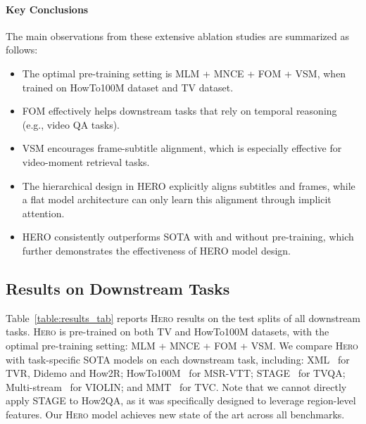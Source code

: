 \documentclass[11pt,a4paper]{article}
\begin{document}
\paragraph{Key Conclusions}

The main observations from these extensive ablation studies are summarized as follows:
\begin{itemize}
 \item The optimal pre-training setting is MLM + MNCE + FOM + VSM, when trained on HowTo100M dataset and TV dataset.
 \vspace{-2mm}
    \item FOM effectively helps downstream tasks that rely on temporal reasoning (e.g., video QA tasks). 
    \vspace{-2mm}
    \item VSM encourages frame-subtitle alignment, which is especially effective for video-moment retrieval tasks.
    \vspace{-2mm}
       \item The hierarchical design in \textsc{HERO} explicitly aligns subtitles and frames, while a flat model architecture can only learn this alignment through implicit attention.
       \vspace{-2mm}
    \item \textsc{HERO} consistently outperforms SOTA with and without pre-training, which further demonstrates the effectiveness of \textsc{HERO} model design.
\end{itemize}

\subsection{Results on Downstream Tasks}\label{sec:sota_comparison}
Table~\ref{table:results_tab} reports \textsc{Hero} results on the test splits of all downstream tasks. \textsc{Hero} is pre-trained on both TV and HowTo100M datasets, with the optimal pre-training setting: MLM + MNCE + FOM + VSM. We compare \textsc{Hero} with task-specific SOTA models on each downstream task, including: XML~\citep{lei2020tvr} for TVR, Didemo and How2R; HowTo100M~\citep{miech2019howto100m} for MSR-VTT; STAGE~\citep{lei2019tvqaplus} for TVQA; Multi-stream~\citep{liu2020violin} for VIOLIN; and MMT~\citep{lei2020tvr} for TVC. Note that we cannot directly apply STAGE to How2QA, as it was specifically designed to leverage region-level features. Our  \textsc{Hero}  model  achieves new state of the art across all benchmarks. 
\end{document}

